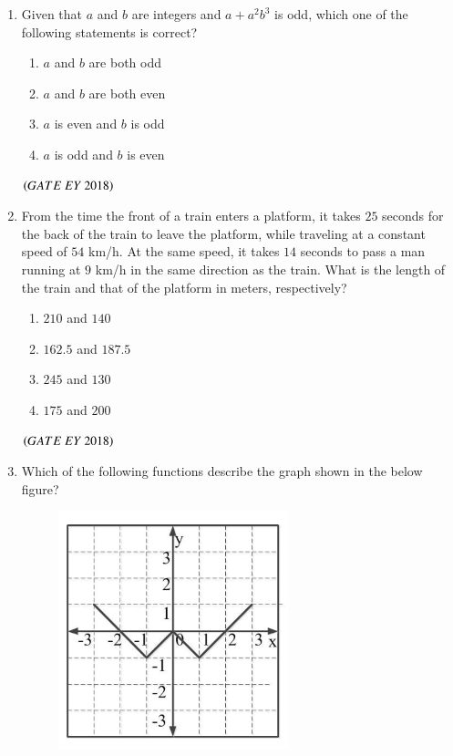 \documentclass[journal]{IEEEtran}
\numberwithin{equation}{enumi}
\numberwithin{figure}{enumi}
\begin{document}
\begin{enumerate}
\bigskip
 \item Given that $a$ and $b$ are integers and $a+a^2b^3$ is odd, which one of the following statements is correct?
\begin{multicols}{2}
\begin{enumerate}
    \item $a$ and $b$ are both odd
    \item $a$ and $b$ are both even
    \item $a$ is even and $b$ is odd
    \item $a$ is odd and $b$ is even
\end{enumerate}
\end{multicols}
\hfill{$\brak{ GATE\ EY\ 2018}$}
\bigskip
\item From the time the front of a train enters a platform, it takes $25$ seconds for the back of the train to leave the platform, while traveling at a constant speed of $54$ km/h. At the same speed, it takes $14$ seconds to pass a man running at $9$ km/h in the same direction as the train. What is the length of the train and that of the platform in meters, respectively?
\begin{multicols}{2}
\begin{enumerate}
    \item $210$ and $140$
    \item $162.5$ and $187.5$
    \item $245$ and $130$
    \item $175$ and $200$
\end{enumerate}
\end{multicols}
\hfill{$\brak{ GATE\ EY\ 2018}$}
\bigskip
\item Which of the following functions describe the graph shown in the below figure?
\begin{figure}[H]
    \centering
    \includegraphics[width=0.5\columnwidth]{figs/9.png}

\end{figure}
\end{enumerate}
\end{document}
